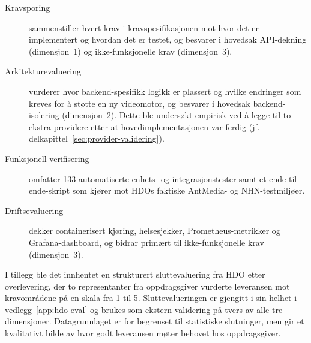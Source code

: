 \begin{description}
    \item[Kravsporing] sammenstiller hvert krav i kravspesifikasjonen mot hvor det er implementert og hvordan det er testet, og besvarer i hovedsak API-dekning (dimensjon~1) og ikke-funksjonelle krav (dimensjon~3).

    \item[Arkitekturevaluering] vurderer hvor backend-spesifikk logikk er plassert og hvilke endringer som kreves for å støtte en ny videomotor, og besvarer i hovedsak backend-isolering (dimensjon~2). Dette ble undersøkt empirisk ved å legge til to ekstra providere etter at hovedimplementasjonen var ferdig (jf. delkapittel~\ref{sec:provider-validering}).

    \item[Funksjonell verifisering] omfatter 133 automatiserte enhets- og integrasjonstester samt et ende-til-ende-skript som kjører mot HDOs faktiske AntMedia- og NHN-testmiljøer.

    \item[Driftsevaluering] dekker containerisert kjøring, helsesjekker, Prometheus-metrikker og Grafana-dashboard, og bidrar primært til ikke-funksjonelle krav (dimensjon~3).
\end{description}

I tillegg ble det innhentet en strukturert sluttevaluering fra HDO etter overlevering, der to representanter fra oppdragsgiver vurderte leveransen mot kravområdene på en skala fra 1 til 5. Sluttevalueringen er gjengitt i sin helhet i vedlegg~\ref{app:hdo-eval} og brukes som ekstern validering på tvers av alle tre dimensjoner. Datagrunnlaget er for begrenset til statistiske slutninger, men gir et kvalitativt bilde av hvor godt leveransen møter behovet hos oppdragsgiver.